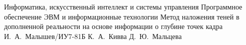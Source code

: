 \documentclass[a4paper]{bmstu}
\begin{document}
\makethesistitle
{Информатика, искусственный интеллект и системы управления} %
{Программное обеспечение ЭВМ и информационные технологии} %
{Метод наложения теней в дополненной реальности на основе информации о глубине точек кадра} %
{И.~А.~Малышев/ИУ7-81Б} %
{К.~А.~Кивва} %
{} %
{Д.~Ю.~Мальцева} %
\end{document}
